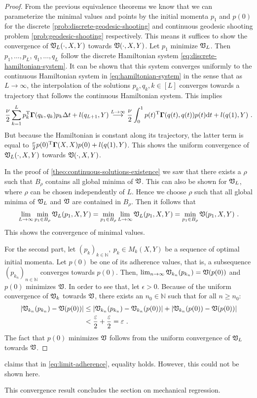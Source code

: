 \begin{proof}
	From the previous equivalence theorems we know that we can parameterize the minimal values and points by the initial momenta $p_1$ and $p(0)$ for the discrete \ref{prob:discrete-geodesic-shooting} and continuous geodesic shooting problem \ref{prob:geodesic-shooting} respectively.
	This means it suffices to show the convergence of $\mathfrak{V}_L(\cdot, X, Y)$ towards $\mathfrak{V}(\cdot, X, Y)$.
	Let $p_1$ minimize $\mathfrak{V}_L$.
	Then $p_1, \ldots, p_L$, $q_1, \ldots, q_L$ follow the discrete Hamiltonian system \ref{eq:discrete-hamiltonian-system}.
	It can be shown that this system converges uniformly to the continuous Hamiltonian system in \cref{eq:hamiltonian-system} in the sense that as $L \rightarrow \infty$, the interpolation of the solutions $p_k, q_k, k \in [L]$ converges towards a trajectory that follows the continuous Hamiltonian system.
	This implies
	\begin{equation}
		\frac{\nu}{2} \sum_{k=1}^L p_k^{\mathrm{T}} \mathbf{\Gamma}(q_k, q_k) p_k \Delta t + l(q_{L+1}, Y) 
		\stackrel{L \rightarrow \infty}{\longrightarrow} \frac{\nu}{2} \int_{0}^{1} p(t)^{\mathrm{T}} \mathbf{\Gamma}(q(t), q(t)) p(t) \mathrm{d} t + l(q(1), Y) \ . 
	\end{equation}
	But because the Hamiltonian is constant along its trajectory, the latter term is equal to $\frac{\nu}{2} p(0)^{\mathrm{T}} \mathbf{\Gamma}(X, X) p(0) + l(q(1), Y)$.
	This shows the uniform convergence of $\mathfrak{V}_L(\cdot, X, Y)$ towards $\mathfrak{V}(\cdot, X, Y)$.
	
	In the proof of \cref{theo:continuous-solutions-existence} we saw that there exists a $\rho$ such that $B_\rho$ contains all global minima of $\mathfrak{V}$.
	This can also be shown for $\mathfrak{V}_L$, where $\rho$ can be chosen independently of $L$.
	Hence we choose $\rho$ such that all global minima of $\mathfrak{V}_L$ and $\mathfrak{V}$ are contained in $B_\rho$.
	Then it follows that
	\begin{equation}
		\lim_{L \rightarrow \infty} \min_{p_1 \in B_\rho} \mathfrak{V}_L(p_1, X, Y) = \min_{p_1 \in B_\rho} \lim_{L \rightarrow \infty}  \mathfrak{V}_L(p_1, X, Y) = \min_{p_1 \in B_\rho} \mathfrak{V}(p_1, X, Y) \ .
	\end{equation}
	This shows the convergence of minimal values.
	
	For the second part, let $(p_k)_{k \in \mathbb{N}},\ p_k \in M_k(X, Y)$ be a sequence of optimal initial momenta.
	Let $p(0)$ be one of its adherence values, that is, a subsequence $(p_{k_n})_{n \in \mathbb{N}}$ converges towards $p(0)$.
	Then, $\lim_{n\rightarrow \infty} \mathfrak{V}_{k_n}(p_{k_n}) = \mathfrak{V}(p(0))$ and $p(0)$ minimizes $\mathfrak{V}$.
	In order to see that, let $\epsilon > 0$. 
	Because of the uniform convergence of $\mathfrak{V}_k$ towards $\mathfrak{V}$, there exists an $n_0 \in \mathbb{N}$ such that for all $n \geq n_0$:
	\begin{align}
		\abs{\mathfrak{V}_{k_n}(p_{k_n}) - \mathfrak{V}(p(0))} 
		&\leq \abs{\mathfrak{V}_{k_n}(p_{k_n}) - \mathfrak{V}_{k_n}(p(0))} + \abs{\mathfrak{V}_{k_n}(p(0)) - \mathfrak{V}(p(0))}\\
		&< \frac{\varepsilon}{2} + \frac{\varepsilon}{2} = \varepsilon \ .
	\end{align}
	The fact that $p(0)$ minimizes $\mathfrak{V}$ follows from the uniform convergence of $\mathfrak{V}_L$ towards $\mathfrak{V}$.
\end{proof}

\citet{owhadi20} claims that in \cref{eq:limit-adherence}, equality holds.
However, this could not be shown here.

This convergence result concludes the section on mechanical regression.
